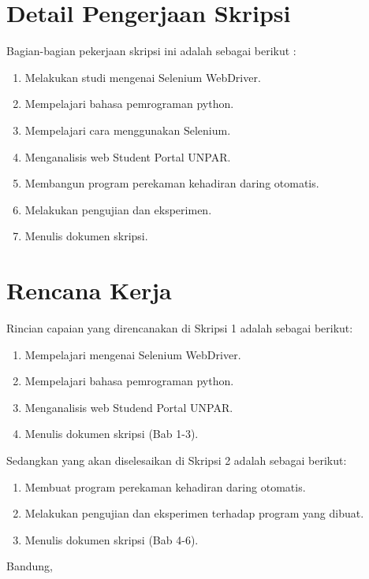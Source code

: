 \documentclass[a4paper,twoside]{article}
\begin{document}
\section{Detail Pengerjaan Skripsi}
Bagian-bagian pekerjaan skripsi ini adalah sebagai berikut :
	\begin{enumerate}
		\item Melakukan studi mengenai Selenium WebDriver.
		\item Mempelajari bahasa pemrograman python.
		\item Mempelajari cara menggunakan Selenium.
		\item Menganalisis web Student Portal UNPAR.
		\item Membangun program perekaman kehadiran daring otomatis.
		\item Melakukan pengujian dan eksperimen.
		\item Menulis dokumen skripsi.		
	\end{enumerate}

\section{Rencana Kerja}
Rincian capaian yang direncanakan di Skripsi 1 adalah sebagai berikut:
\begin{enumerate}
\item Mempelajari mengenai Selenium WebDriver.
\item Mempelajari bahasa pemrograman python.
\item Menganalisis web Studend Portal UNPAR.
\item Menulis dokumen skripsi (Bab 1-3).
\end{enumerate}

Sedangkan yang akan diselesaikan di Skripsi 2 adalah sebagai berikut:
\begin{enumerate}
\item Membuat program perekaman kehadiran daring otomatis.
\item Melakukan pengujian dan eksperimen terhadap program yang dibuat.
\item Menulis dokumen skripsi (Bab 4-6).
\end{enumerate}

\vspace{1cm} %
\centering Bandung, \tanggal\\
\vspace{2cm} \nama \\ 
\vspace{1cm}
\end{document}
